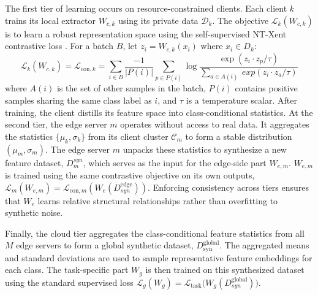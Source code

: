 The first tier of learning occurs on resource-constrained clients. Each client $k$ trains its local extractor \textcolor{black}{$W_{c,k}$} using its private data $\mathcal{D}_k$. The objective $\mathcal{L}_k(W_{c,k})$ is to learn a robust representation space using the self-supervised NT-Xent contrastive loss \cite{chen2020simple}. For a batch $B$, let $z_i = W_{c,k}(x_i)$ where $x_i \in D_k$:
\begin{equation}
    \label{eq:supcon}
    \mathcal{L}_{k}(W_{c,k})= \mathcal{L}_{\text{con}, k} = \sum_{i\in B}\frac{-1}{|P(i)|}\sum_{p\in P(i)}\log\frac{\exp(z_{i}\cdot z_{p}/\tau)}{\sum_{a\in A(i)}\
    exp(z_{i}\cdot z_{a}/\tau)}
\end{equation}
where $A(i)$ is the set of other samples in the batch, $P(i)$ contains positive samples sharing the same class label as $i$, and $\tau$ is a temperature scalar. After training, the client distills its feature space into class-conditional statistics.
At the second tier, the edge server $m$ operates without access to real data. It aggregates the statistics $\{\mu_k, \sigma_k\}$ from its client cluster $\mathcal{C}_m$ to form a stable distribution $(\mu_m, \sigma_m)$. The edge server $m$ unpacks these statistics to synthesize a new feature dataset, $D^{syn}_m$, which serves as the input for the edge-side part $W_{e,m}$. $W_{e,m}$ is trained using the same contrastive objective on its own outputs, $\mathcal{L}_m(W_{e,m}) = \mathcal{L}_{\text{con}, m}(W_e(D_{syn}^{\text{edge}}))$. Enforcing consistency across tiers ensures that $W_e$ learns relative structural relationships rather than overfitting to synthetic noise.

Finally, the cloud tier aggregates the class-conditional feature statistics from all $M$ edge servers to form a global synthetic dataset, $D_{\text{syn}}^{\text{global}}$. The aggregated means and standard deviations are used to sample representative feature embeddings for each class. The task-specific part $W_g$ is then trained on this synthesized dataset using the standard supervised loss $\mathcal{L}_g(W_g) = \mathcal{L}_{\text{task}}\big(W_g(D_{syn}^{\text{global}})\big)$.

